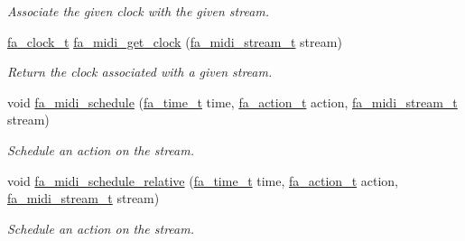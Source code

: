 \begin{DoxyCompactItemize}
\begin{DoxyCompactList}\small\item\em Associate the given clock with the given stream. \end{DoxyCompactList}\item 
\hyperlink{group___fa_clock_ga20b3a0f49788fbedba140b1d315d2313}{fa\-\_\-clock\-\_\-t} \hyperlink{group___fa_midi_ga120b0e56a83ab18da64499570e22c7b7}{fa\-\_\-midi\-\_\-get\-\_\-clock} (\hyperlink{group___fa_midi_ga85772039b62d8bb718a51e1ffbbb2fa2}{fa\-\_\-midi\-\_\-stream\-\_\-t} stream)
\begin{DoxyCompactList}\small\item\em Return the clock associated with a given stream. \end{DoxyCompactList}\item 
void \hyperlink{group___fa_midi_ga9a269b2817ba3371d5b58493e33c0229}{fa\-\_\-midi\-\_\-schedule} (\hyperlink{group___fa_time_ga227cc693f20b4873fed11028bcade184}{fa\-\_\-time\-\_\-t} time, \hyperlink{group___fa_action_gadb08ae063168671e5fedc6c23f20ae4b}{fa\-\_\-action\-\_\-t} action, \hyperlink{group___fa_midi_ga85772039b62d8bb718a51e1ffbbb2fa2}{fa\-\_\-midi\-\_\-stream\-\_\-t} stream)
\begin{DoxyCompactList}\small\item\em Schedule an action on the stream. \end{DoxyCompactList}\item 
void \hyperlink{group___fa_midi_ga69d4b4f30d7cb997df0ff26b61f94400}{fa\-\_\-midi\-\_\-schedule\-\_\-relative} (\hyperlink{group___fa_time_ga227cc693f20b4873fed11028bcade184}{fa\-\_\-time\-\_\-t} time, \hyperlink{group___fa_action_gadb08ae063168671e5fedc6c23f20ae4b}{fa\-\_\-action\-\_\-t} action, \hyperlink{group___fa_midi_ga85772039b62d8bb718a51e1ffbbb2fa2}{fa\-\_\-midi\-\_\-stream\-\_\-t} stream)
\begin{DoxyCompactList}\small\item\em Schedule an action on the stream. \end{DoxyCompactList}\end{DoxyCompactItemize}


